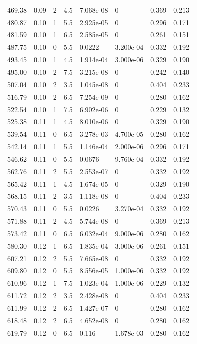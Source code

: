 \documentclass[preview]{standalone}
\begin{document}
{{{\begin{tabular}{L{1.2cm}C{1.2cm} C{0.3cm}C{0.5cm} C{1.4cm}C{1.4cm} C{1.4cm}C{1.4cm}}
  469.38  &  0.09  & 2     & 4.5 &  7.068e-08  & 0  & 0.369 &  0.213   \\ 
  480.87  &  0.10  & 1     & 5.5 &  2.925e-05  & 0  & 0.296 &  0.171   \\ 
  481.59  &  0.10  & 1     & 6.5 &  2.585e-05  & 0  & 0.261 &  0.151   \\ 
  487.75  &  0.10  & 0     & 5.5 &  0.0222  & 3.200e-04  & 0.332 &  0.192   \\ 
  493.45  &  0.10  & 1     & 4.5 &  1.914e-04  & 3.000e-06  & 0.329 &  0.190   \\ 
  495.00  &  0.10  & 2     & 7.5 &  3.215e-08  & 0  & 0.242 &  0.140   \\ 
  507.04  &  0.10  & 2     & 3.5 &  1.045e-08  & 0  & 0.404 &  0.233   \\ 
  516.79  &  0.10  & 2     & 6.5 &  7.254e-09  & 0  & 0.280 &  0.162   \\ 
  522.54  &  0.10  & 1     & 7.5 &  6.902e-06  & 0  & 0.229 &  0.132   \\ 
  525.38  &  0.11  & 1     & 4.5 &  8.010e-06  & 0  & 0.329 &  0.190   \\ 
  539.54  &  0.11  & 0     & 6.5 &  3.278e-03  & 4.700e-05  & 0.280 &  0.162   \\ 
  542.14  &  0.11  & 1     & 5.5 &  1.146e-04  & 2.000e-06  & 0.296 &  0.171   \\ 
  546.62  &  0.11  & 0     & 5.5 &  0.0676  & 9.760e-04  & 0.332 &  0.192   \\ 
  562.76  &  0.11  & 2     & 5.5 &  2.553e-07  & 0  & 0.332 &  0.192   \\ 
  565.42  &  0.11  & 1     & 4.5 &  1.674e-05  & 0  & 0.329 &  0.190   \\ 
  568.15  &  0.11  & 2     & 3.5 &  1.118e-08  & 0  & 0.404 &  0.233   \\ 
  570.43  &  0.11  & 0     & 5.5 &  0.0226  & 3.270e-04  & 0.332 &  0.192   \\ 
  571.88  &  0.11  & 2     & 4.5 &  5.744e-08  & 0  & 0.369 &  0.213   \\ 
  573.42  &  0.11  & 0     & 6.5 &  6.032e-04  & 9.000e-06  & 0.280 &  0.162   \\ 
  580.30  &  0.12  & 1     & 6.5 &  1.835e-04  & 3.000e-06  & 0.261 &  0.151   \\ 
  607.21  &  0.12  & 2     & 5.5 &  7.665e-08  & 0  & 0.332 &  0.192   \\ 
  609.80  &  0.12  & 0     & 5.5 &  8.556e-05  & 1.000e-06  & 0.332 &  0.192   \\ 
  610.96  &  0.12  & 1     & 7.5 &  1.023e-04  & 1.000e-06  & 0.229 &  0.132   \\ 
  611.72  &  0.12  & 2     & 3.5 &  2.428e-08  & 0  & 0.404 &  0.233   \\ 
  611.99  &  0.12  & 2     & 6.5 &  1.427e-07  & 0  & 0.280 &  0.162   \\ 
  618.48  &  0.12  & 2     & 6.5 &  4.652e-08  & 0  & 0.280 &  0.162   \\ 
  619.79  &  0.12  & 0     & 6.5 &  0.116  & 1.678e-03  & 0.280 &  0.162   \\ 
\hline 
\end{tabular} 

}}}
\end{document}
